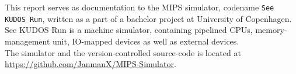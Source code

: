 This report serves as documentation to the MIPS simulator, codename
\texttt{See KUDOS Run}, written as a part of a bachelor project at University
of Copenhagen. See KUDOS Run is a machine simulator, containing pipelined CPUs,
memory-management unit, IO-mapped devices as well as external devices.\\
The simulator and the version-controlled source-code is located at \url{https://github.com/JanmanX/MIPS-Simulator}.

